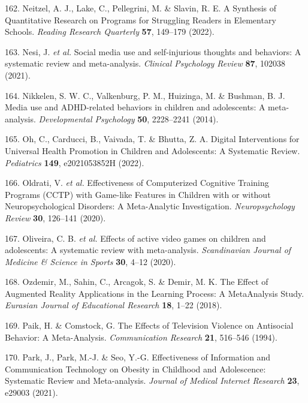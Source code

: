 \documentclass[
  english,
  man]{apa6}
\newenvironment{cslreferences}%
  {}%
  {\par}
\begin{document}
\begin{cslreferences}
\leavevmode\hypertarget{ref-neitzelSynthesisQuantitativeResearch2022}{}%
162. Neitzel, A. J., Lake, C., Pellegrini, M. \& Slavin, R. E. A Synthesis of Quantitative Research on Programs for Struggling Readers in Elementary Schools. \emph{Reading Research Quarterly} \textbf{57}, 149--179 (2022).

\leavevmode\hypertarget{ref-nesiSocialMediaUse2021}{}%
163. Nesi, J. \emph{et al.} Social media use and self-injurious thoughts and behaviors: A systematic review and meta-analysis. \emph{Clinical Psychology Review} \textbf{87}, 102038 (2021).

\leavevmode\hypertarget{ref-nikkelenMediaUseADHDrelated2014}{}%
164. Nikkelen, S. W. C., Valkenburg, P. M., Huizinga, M. \& Bushman, B. J. Media use and ADHD-related behaviors in children and adolescents: A meta-analysis. \emph{Developmental Psychology} \textbf{50}, 2228--2241 (2014).

\leavevmode\hypertarget{ref-ohDigitalInterventionsUniversal2022}{}%
165. Oh, C., Carducci, B., Vaivada, T. \& Bhutta, Z. A. Digital Interventions for Universal Health Promotion in Children and Adolescents: A Systematic Review. \emph{Pediatrics} \textbf{149}, e2021053852H (2022).

\leavevmode\hypertarget{ref-oldratiEffectivenessComputerizedCognitive2020}{}%
166. Oldrati, V. \emph{et al.} Effectiveness of Computerized Cognitive Training Programs (CCTP) with Game-like Features in Children with or without Neuropsychological Disorders: A Meta-Analytic Investigation. \emph{Neuropsychology Review} \textbf{30}, 126--141 (2020).

\leavevmode\hypertarget{ref-oliveiraEffectsActiveVideo2020}{}%
167. Oliveira, C. B. \emph{et al.} Effects of active video games on children and adolescents: A systematic review with meta-analysis. \emph{Scandinavian Journal of Medicine \& Science in Sports} \textbf{30}, 4--12 (2020).

\leavevmode\hypertarget{ref-ozdemirEffectAugmentedReality2018}{}%
168. Ozdemir, M., Sahin, C., Arcagok, S. \& Demir, M. K. The Effect of Augmented Reality Applications in the Learning Process: A MetaAnalysis Study. \emph{Eurasian Journal of Educational Research} \textbf{18}, 1--22 (2018).

\leavevmode\hypertarget{ref-paikEffectsTelevisionViolence1994}{}%
169. Paik, H. \& Comstock, G. The Effects of Television Violence on Antisocial Behavior: A Meta-Analysis. \emph{Communication Research} \textbf{21}, 516--546 (1994).

\leavevmode\hypertarget{ref-parkEffectivenessInformationCommunication2021}{}%
170. Park, J., Park, M.-J. \& Seo, Y.-G. Effectiveness of Information and Communication Technology on Obesity in Childhood and Adolescence: Systematic Review and Meta-analysis. \emph{Journal of Medical Internet Research} \textbf{23}, e29003 (2021).


\end{cslreferences}
\end{document}
